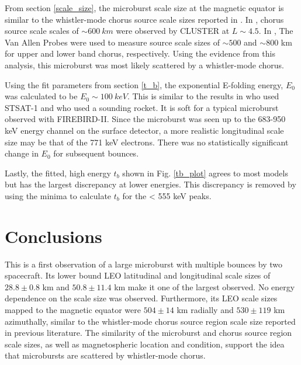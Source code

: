 \documentclass[draft,linenumbers]{agujournal}
\begin{document}
From section \ref{scale_size}, the microburst scale size at the magnetic equator is similar to the whistler-mode chorus source scale sizes reported in \citet{Agapitov11b, Agapitov17a}. In \citet{Agapitov11b}, chorus source scale scales of $\sim 600 \ km$ were observed by CLUSTER at $L \sim 4.5$. In \citet{Agapitov17a}, The Van Allen Probes were used to measure source scale sizes of $\sim 500$ and $\sim 800$ km for upper and lower band chorus, respectively. Using the evidence from this analysis, this microburst was most likely scattered by a whistler-mode chorus.

Using the fit parameters from section \ref{t_b}, the exponential E-folding energy, $E_0$ was calculated to be $E_0 \sim 100 \ keV$. This is similar to the results in \citet{Lee05} who used STSAT-1 and \citet{Datta1997} who used a sounding rocket. It is soft for a typical microburst observed with FIREBIRD-II. Since the microburst was seen up to the 683-950 keV energy channel on the surface detector, a more realistic longitudinal scale size may be that of the 771 keV electrons. There was no statistically significant change in $E_0$ for subsequent bounces.

Lastly, the fitted, high energy $t_b$ shown in Fig. \ref{tb_plot} agrees to most models but has the largest discrepancy at lower energies. This discrepancy is removed by using the minima to calculate $t_b$ for the < 555 keV peaks.

\section{Conclusions}
This is a first observation of a large microburst with multiple bounces by two spacecraft. Its lower bound LEO latitudinal and longitudinal scale sizes of $28.8 \pm 0.8$ km and $ 50.8 \pm 11.4$  km make it one of the largest observed. No energy dependence on the scale size was observed. Furthermore, its LEO scale sizes mapped to the magnetic equator were  $504 \pm​ 14$ km radially and $530 \pm 119$ km azimuthally, similar to the whistler-mode chorus source region scale size reported in previous literature. The similarity of the microburst and chorus source region scale sizes, as well as magnetospheric location and condition, support the idea that microbursts are scattered by whistler-mode chorus.
\end{document}
